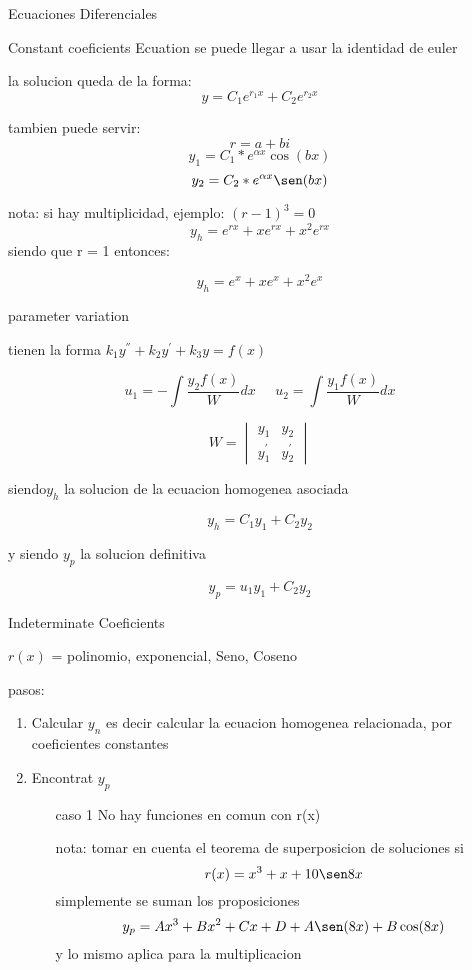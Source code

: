 \begin{section}{Ecuaciones Diferenciales}
\begin{subsection}{Constant coeficients Ecuation}
		se puede llegar a usar la identidad de euler
		
		la solucion queda de la forma:
		$$y=C_1e^{r_1x} + C_2e^{r_2x}$$
		
		tambien puede servir:
		$$r = a + bi $$
		$$ y_1 = C_1*e^{ \alpha x } \cos (bx)$$
		$$ y_2 = C_2*e^{ \alpha x } \sen (bx) $$
		
		
		nota:
		si hay multiplicidad, ejemplo: $(r-1)^3 = 0 $
		$$y_h = e^{rx} + xe^{rx} + x^2e^{rx}$$
		siendo que r = 1 entonces:

		$$y_h = e^x + xe^x + x^2e^x$$	
	\end{subsection}
	\begin{subsection}{parameter variation}
		
		tienen la forma $k_1y^{''} + k_2y^{'} + k_3y = f(x) $
		
		$$u_1 = - \int \frac{y_2f(x)}{W} dx \;\; \;\;\; u_2 =  \int \frac{y_1f(x)}{W} dx $$
		
		$$
		W=
		\begin{vmatrix}
		y_1 & y_2 \\
			y_1^{'} & y_2^{'}
		\end{vmatrix}
		$$
		\begin{center}
			siendo$y_h$ la solucion de la ecuacion homogenea asociada
		
			$$ y_h = C_1y_1 + C_2y_2 $$
		
			y siendo $y_p$ la solucion definitiva
		
			$$ y_p = u_1y_1 + C_2y_2 $$
		
		\end{center}
	
	\end{subsection}
	\begin{subsection}{Indeterminate Coeficients}
		\begin{center}
			$r(x)$ = polinomio, exponencial, Seno, Coseno 
		\end{center}
		
		pasos:
		\begin{enumerate}
			\item Calcular $y_n$ es decir
				calcular la ecuacion homogenea relacionada, por coeficientes constantes
				
			\item Encontrat $y_p$
				\begin{enumerate}
					\item[caso 1] No hay funciones en comun con r(x)
		
						nota: tomar en cuenta el teorema de superposicion de soluciones
						si $$r(x) = x^3 + x +  10 \sen 8x$$
						simplemente se suman los proposiciones
						 $$y_p = Ax^3 + Bx^2 + Cx + D +  A \sen (8x) + B \cos (8x) $$
						 y lo mismo aplica para la multiplicacion
		

\end{enumerate}
\end{enumerate}
\end{subsection}
\end{section}
